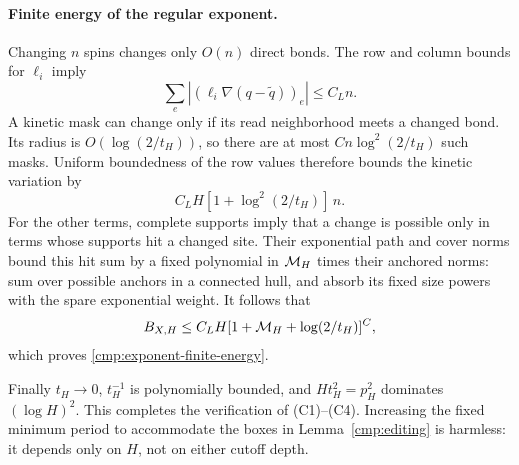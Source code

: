 \paragraph{Finite energy of the regular exponent.}
Changing \(n\) spins changes only \(O(n)\) direct bonds.  The row and
column bounds for \(\ell_i\) imply
\[
 \sum_e|(\ell_i\nabla(q-\widetilde q))_e|\le C_L n.
\]
A kinetic mask can change only if its read neighborhood meets a changed
bond.  Its radius is \(O(\log(2/t_H))\), so there are at most
\(C n\log^2(2/t_H)\) such masks.  Uniform boundedness of the row values
therefore bounds the kinetic variation by
\[
 C_LH[1+\log^2(2/t_H)]\,n.
\]
For the other terms, complete supports imply that a change is possible
only in terms whose supports hit a changed site.  Their exponential
path and cover norms bound this hit sum by a fixed polynomial in
\({\cal M}_H\) times their anchored norms: sum over possible anchors
in a connected hull, and absorb its fixed size powers with the spare
exponential weight.  It follows that
\[
 B_{X,H}\le C_LH[1+{\cal M}_H+\log(2/t_H)]^C,
\]
which proves \eqref{cmp:exponent-finite-energy}.

Finally \(t_H\to0\), \(t_H^{-1}\) is polynomially bounded, and
\(Ht_H^2=p_H^2\) dominates \((\log H)^2\).  This completes the
verification of (C1)--(C4).  Increasing the fixed minimum period to
accommodate the boxes in Lemma~\ref{cmp:editing} is harmless: it depends
only on \(H\), not on either cutoff depth.


